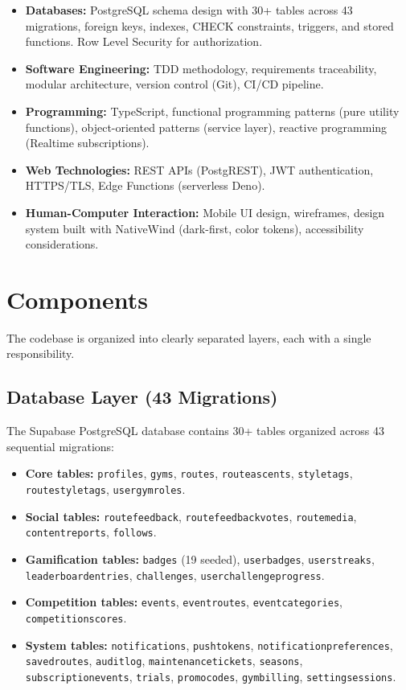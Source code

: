 \documentclass[12pt,a4paper]{report}
\renewcommand\_{\textunderscore\hspace{0pt}}
\begin{document}
\begin{itemize}[noitemsep]
    \item \textbf{Databases:} PostgreSQL schema design with 30+ tables across 43 migrations, foreign keys, indexes, CHECK constraints, triggers, and stored functions. Row Level Security for authorization.
    \item \textbf{Software Engineering:} TDD methodology, requirements traceability, modular architecture, version control (Git), CI/CD pipeline.
    \item \textbf{Programming:} TypeScript, functional programming patterns (pure utility functions), object-oriented patterns (service layer), reactive programming (Realtime subscriptions).
    \item \textbf{Web Technologies:} REST APIs (PostgREST), JWT authentication, HTTPS/TLS, Edge Functions (serverless Deno).
    \item \textbf{Human-Computer Interaction:} Mobile UI design, wireframes, design system built with NativeWind \cite{NWDo25} (dark-first, color tokens), accessibility considerations.
\end{itemize}

\section{Components}

The codebase is organized into clearly separated layers, each with a single responsibility.

\subsection{Database Layer (43 Migrations)}

The Supabase PostgreSQL database contains 30+ tables organized across 43 sequential migrations:

\begin{itemize}[noitemsep]
    \item \textbf{Core tables:} \texttt{profiles}, \texttt{gyms}, \texttt{routes}, \texttt{route\_ascents}, \texttt{style\_tags}, \texttt{route\_style\_tags}, \texttt{user\_gym\_roles}.
    \item \textbf{Social tables:} \texttt{route\_feedback}, \texttt{route\_feedback\_votes}, \texttt{route\_media}, \texttt{content\_reports}, \texttt{follows}.
    \item \textbf{Gamification tables:} \texttt{badges} (19 seeded), \texttt{user\_badges}, \texttt{user\_streaks}, \texttt{leaderboard\_entries}, \texttt{challenges}, \texttt{user\_challenge\_progress}.
    \item \textbf{Competition tables:} \texttt{events}, \texttt{event\_routes}, \texttt{event\_categories}, \texttt{competition\_scores}.
    \item \textbf{System tables:} \texttt{notifications}, \texttt{push\_tokens}, \texttt{notification\_preferences}, \texttt{saved\_routes}, \texttt{audit\_log}, \texttt{maintenance\_tickets}, \texttt{seasons}, \texttt{subscription\_\allowbreak events}, \texttt{trials}, \texttt{promo\_codes}, \texttt{gym\_billing}, \texttt{setting\_sessions}.
\end{itemize}
\end{document}
